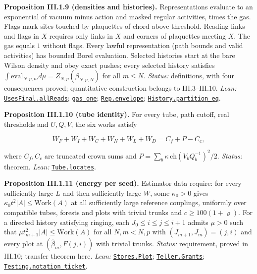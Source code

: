 \documentclass[
  letterpaper,
  11pt]{article}
\begin{document}
\textbf{Proposition III.1.9 (densities and histories).} Representations
evaluate to an exponential of vacuum minus action and masked regular
activities, times the gas. Flags mark sites touched by plaquettes of
chord above threshold. Reading links and flags in \(X\) requires only
links in \(X\) and corners of plaquettes meeting \(X\). The gas equals
\(1\) without flags. Every lawful representation (path bounds and valid
activities) has bounded Borel evaluation. Selected histories start at
the bare Wilson density and obey exact pushes; every selected history
satisfies \(\int\mathrm{eval}_{N,p,m}d\mu=Z_{N,p}(\beta_{N,p,N})\) for
all \(m\le N\). \emph{Status:} definitions, with four consequences
proved; quantitative construction belongs to III.3--III.10. \emph{Lean:}
\href{https://github.com/yang-mills-group/OpenAI-YM-20261028/blob/3456e5e75cf8d4cd558955a5c7638fba2d68f464/YM/RG/Masks.lean\#L108-L110}{\texttt{UsesFinal.allReads}};
\href{https://github.com/yang-mills-group/OpenAI-YM-20261028/blob/3456e5e75cf8d4cd558955a5c7638fba2d68f464/YM/RG/Activities.lean\#L135-L147}{\texttt{gas\_one}};
\href{https://github.com/yang-mills-group/OpenAI-YM-20261028/blob/3456e5e75cf8d4cd558955a5c7638fba2d68f464/YM/RG/History.lean\#L195-L198}{\texttt{Rep.envelope}};
\href{https://github.com/yang-mills-group/OpenAI-YM-20261028/blob/3456e5e75cf8d4cd558955a5c7638fba2d68f464/YM/RG/History.lean\#L242-L249}{\texttt{History.partition\_eq}}.

\textbf{Proposition III.1.10 (tube identity).} For every tube, path
cutoff, real thresholds and \(U,Q,V\), the six works satisfy

\[W_F+W_I+W_C+W_N+W_L+W_D=C_f+P-C_c,\]

where \(C_f,C_c\) are truncated crown sums and
\(P=\sum_b\kappa\,\mathrm{ch}(V_bQ_b^{-1})^2/2\). \emph{Status:}
theorem. \emph{Lean:}
\href{https://github.com/yang-mills-group/OpenAI-YM-20261028/blob/3456e5e75cf8d4cd558955a5c7638fba2d68f464/YM/Pressure/Rows.lean\#L145-L163}{\texttt{Tube.locates}}.

\textbf{Proposition III.1.11 (energy per seed).} Estimator data require:
for every sufficiently large \(L\) and then sufficiently large \(W\),
some \(\kappa_0>0\) gives \(\kappa_0t^2|A|\le\mathrm{Work}(A)\) at all
sufficiently large reference couplings, uniformly over compatible tubes,
forests and plots with trivial trunks and \(c\ge100(1+\varrho)\). For a
directed history satisfying ringing, each \(J_0\le i\le j\le i+1\)
admits \(\mu>0\) such that \(\mu t_{m+1}^2|A|\le\mathrm{Work}(A)\) for
all \(N,m<N,p\) with \((J_{m+1},J_m)=(j,i)\) and every plot at
\((\hat\beta_m,F(j,i))\) with trivial trunks. \emph{Status:}
requirement, proved in III.10; transfer theorem here. \emph{Lean:}
\href{https://github.com/yang-mills-group/OpenAI-YM-20261028/blob/3456e5e75cf8d4cd558955a5c7638fba2d68f464/YM/Pressure/Seeds.lean\#L51-L58}{\texttt{Stores.Plot}};
\href{https://github.com/yang-mills-group/OpenAI-YM-20261028/blob/3456e5e75cf8d4cd558955a5c7638fba2d68f464/YM/Pressure/Seeds.lean\#L129-L131}{\texttt{Teller.Grants}};
\href{https://github.com/yang-mills-group/OpenAI-YM-20261028/blob/3456e5e75cf8d4cd558955a5c7638fba2d68f464/YM/Pressure/Seeds.lean\#L166-L181}{\texttt{Testing.notation\_ticket}}.
\end{document}
